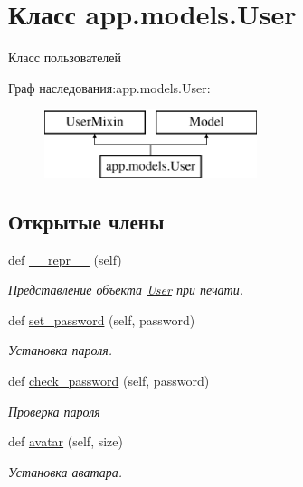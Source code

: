 \hypertarget{classapp_1_1models_1_1_user}{}\section{Класс app.\+models.\+User}
\label{classapp_1_1models_1_1_user}


Класс пользователей  


Граф наследования\+:app.\+models.\+User\+:\begin{figure}[H]
\begin{center}
\leavevmode
\includegraphics[height=2.000000cm]{classapp_1_1models_1_1_user}
\end{center}
\end{figure}
\subsection*{Открытые члены}
\begin{DoxyCompactItemize}
\item 
def \mbox{\hyperlink{classapp_1_1models_1_1_user_a7569b5686d9aa38eb081b4d811338d9f}{\+\_\+\+\_\+repr\+\_\+\+\_\+}} (self)
\begin{DoxyCompactList}\small\item\em Представление объекта \mbox{\hyperlink{classapp_1_1models_1_1_user}{User}} при печати. \end{DoxyCompactList}\item 
def \mbox{\hyperlink{classapp_1_1models_1_1_user_aa8be40797a363177fd35d541da309297}{set\+\_\+password}} (self, password)
\begin{DoxyCompactList}\small\item\em Установка пароля. \end{DoxyCompactList}\item 
def \mbox{\hyperlink{classapp_1_1models_1_1_user_ab75430896da76337b5eb18763f2a18c3}{check\+\_\+password}} (self, password)
\begin{DoxyCompactList}\small\item\em Проверка пароля \end{DoxyCompactList}\item 
def \mbox{\hyperlink{classapp_1_1models_1_1_user_afbfdcc8d14cb2c09cca368406be71764}{avatar}} (self, size)
\begin{DoxyCompactList}\small\item\em Установка аватара. \end{DoxyCompactList}\end{DoxyCompactItemize}
